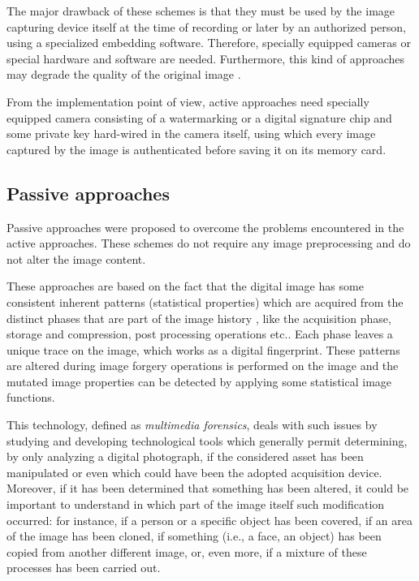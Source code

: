 The major drawback of these schemes is that they must be used by the image capturing device itself at the time of recording or later by an authorized person, using a specialized embedding software. Therefore, specially equipped cameras or special hardware and software are needed. Furthermore, this kind of approaches may degrade the quality of the original image \cite{van2007survey}.

From the implementation point of view, active approaches need specially equipped camera consisting of a watermarking or a digital signature chip and some private key hard-wired in the camera itself, using which every image captured by the image is authenticated before saving it on its memory card. 

\subsection{Passive approaches}

Passive approaches\cite{ng2006passive} were proposed to overcome the problems encountered in the active approaches. These schemes do not require any image preprocessing and do not alter the image content.  

These approaches are based on the fact that the digital image has some consistent inherent
patterns (statistical properties) which are acquired from the distinct phases that are part of the image history \cite{piva2013overview}, like the acquisition phase, storage and compression, post processing operations etc.. Each phase leaves a unique trace on the image, which works as a digital fingerprint.
These patterns are altered during image forgery operations is performed on the image and the mutated image properties can be detected by applying some statistical image functions.

This technology, defined as \emph{multimedia forensics}\cite{farid2009image}\cite{van2007survey}\cite{mahdian2010bibliography}, deals with such issues by studying and developing technological tools which generally permit determining, by only analyzing a digital photograph, if the considered asset has been manipulated or even which could have been the adopted acquisition device. Moreover, if it has been determined that something has been altered, it could be important to understand in which part of the image itself such modification occurred: for instance, if a person or a specific object has been covered, if an area of the image has been cloned, if something (i.e., a face, an object) has been copied from another different image, or, even more, if a mixture of these processes has been carried out. 

